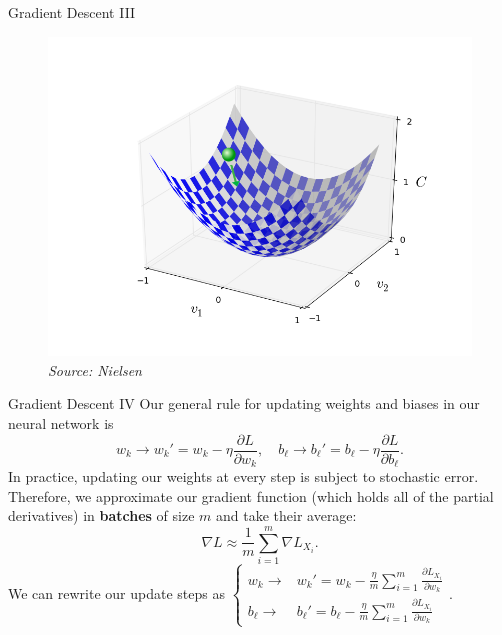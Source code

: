 \documentclass[xcolor=dvipsnames, fontsize=11pt, %
pagesize, %
parskip=half-, t]{beamer}
\begin{document}
 \begin{frame}[c]{Gradient Descent III}
 \begin{figure}[H] \center
 \includegraphics[scale=0.32]{valley_with_ball.png}
 \caption{\textit{Source: Nielsen}}
 \end{figure}
 \end{frame}
 \begin{frame}{Gradient Descent IV}
 Our general rule for updating weights and biases in our neural network is $$w_k\to w_k'=w_k-\eta \frac{\partial L}{\partial w_k}, \quad b_{\ell}\to b_{\ell}'=b_{\ell}-\eta \frac{\partial L}{\partial b_{\ell}}.$$
 In practice, updating our weights at every step is subject to stochastic error.  Therefore, we approximate our gradient function (which holds all of the partial derivatives) in \textbf{batches} of size $m$ and take their average: $$\nabla L\approx \frac{1}{m}\sum_{i=1}^{m}\nabla L_{X_i}.$$   
 We can rewrite our update steps as $\begin{cases} w_k\to & w_k'=w_k-\frac{\eta}{m} \sum_{i=1}^{m} \frac{\partial L_{X_i}}{\partial w_k} \\  b_{\ell}\to & b_{\ell}'=b_{\ell}-\frac{\eta}{m} \sum_{i=1}^{m} \frac{\partial L_{X_i}}{\partial w_k} \end{cases}.$
 
 \end{frame}
\end{document}
